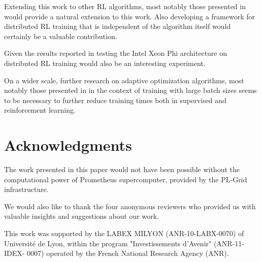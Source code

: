 \documentclass{llncs}
\begin{document}
Extending this work to other RL algorithms, most notably those presented in \cite{trpo,ppo,acer} would provide a natural extension to this work. Also developing a framework for distributed RL training that is independent of the algorithm itself would certainly be a valuable contribution.

Given the results reported in \cite{100_epoch_alexnet} testing the Intel\textsuperscript{\textregistered} Xeon Phi architecture on distributed RL training would also be an interesting experiment.

On a wider scale, further research on adaptive  optimization algorithms, most notably those presented in \cite{adam_paper,adagrad,rmsprop_paper} in the context of training with large batch sizes seems to be necessary to further reduce training times both in supervised and reinforcement learning.  

\section{Acknowledgments}

The work presented in this paper would not have been possible without the computational power of Prometheus supercomputer, provided by the PL-Grid infrastructure.

We would also like to thank the four anonymous reviewers who provided us with valuable insights and suggestions about our work.

This work was supported by the LABEX MILYON (ANR-10-LABX-0070) of Universit\'e de Lyon, within the program "Investissements d'Avenir" (ANR-11-IDEX- 0007) operated by the French National Research Agency (ANR). 



\end{document}
